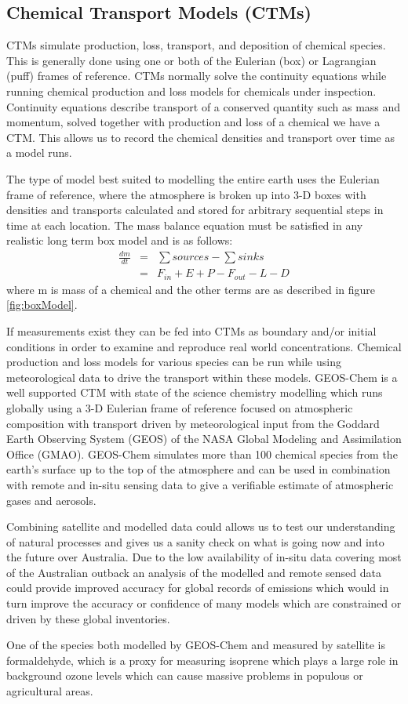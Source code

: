 \subsection{Chemical Transport Models (CTMs)}
CTMs simulate production, loss, transport, and deposition of chemical species.
This is generally done using one or both of the Eulerian (box) or Lagrangian (puff) frames of reference.
CTMs normally solve the continuity equations while running chemical production and loss models for chemicals under inspection. 
Continuity equations describe transport of a conserved quantity such as mass and momentum, solved together with production and loss of a chemical we have a CTM.
This allows us to record the chemical densities and transport over time as a model runs.

The type of model best suited to modelling the entire earth uses the Eulerian frame of reference, where the atmosphere is broken up into 3-D boxes with densities and transports calculated and stored for arbitrary sequential steps in time at each location.
The mass balance equation must be satisfied in any realistic long term box model and is as follows: 
\begin{eqnarray*}
\frac{dm}{dt} &=& \sum{sources}-\sum{sinks} \\
    &=& F_{in} + E + P - F_{out} - L - D \end{eqnarray*}
where m is mass of a chemical and the other terms are as described in figure \ref{fig:boxModel}.

If measurements exist they can be fed into CTMs as boundary and/or initial conditions in order to examine and reproduce real world concentrations.
Chemical production and loss models for various species can be run while using meteorological data to drive the transport within these models.
GEOS-Chem is a well supported CTM with state of the science chemistry modelling which runs globally using a 3-D Eulerian frame of reference focused on atmospheric composition with transport driven by meteorological input from the Goddard Earth Observing System (GEOS) of the NASA Global Modeling and Assimilation Office (GMAO).
GEOS-Chem simulates more than 100 chemical species from the earth's surface up to the top of the atmosphere and can be used in combination with remote and in-situ sensing data to give a verifiable estimate of atmospheric gases and aerosols.

Combining satellite and modelled data could allows us to test our understanding of natural processes and gives us a sanity check on what is going now and into the future over Australia.
Due to the low availability of in-situ data covering most of the Australian outback an analysis of the modelled and remote sensed data could provide improved accuracy for global records of emissions which would in turn improve the accuracy or confidence of many models which are constrained or driven by these global inventories.

One of the species both modelled by GEOS-Chem and measured by satellite is formaldehyde, which is a proxy for measuring isoprene which plays a large role in background ozone levels which can cause massive problems in populous or agricultural areas.